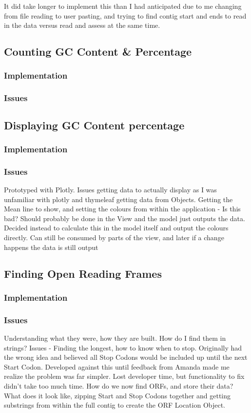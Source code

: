 It did take longer to implement this than I had anticipated due to me changing from file reading to user pasting, and trying to find contig start and ends to read in the data versus read and assess at the same time.

\subsection{Counting GC Content \& Percentage}
\subsubsection{Implementation}
\subsubsection{Issues}

\subsection{Displaying GC Content percentage}
\subsubsection{Implementation}
\subsubsection{Issues}
Prototyped with Plotly. Issues getting data to actually display as I was unfamiliar with plotly and thymeleaf getting data from Objects.
Getting the Mean line to show, and setting the colours from within the application - Is this bad? Should probably be done in the View and the model just outputs the data. Decided instead to calculate this in the model itself and output the colours directly. Can still be consumed by parts of the view, and later if a change happens the data is still output

\subsection{Finding Open Reading Frames}
\subsubsection{Implementation}
\subsubsection{Issues}
Understanding what they were, how they are built. How do I find them in strings? Issues - Finding the longest, how to know when to stop. Originally had the wrong idea and believed all Stop Codons would be included up until the next Start Codon. Developed against this until feedback from Amanda made me realize the problem was far simpler. Lost developer time, but functionality to fix didn't take too much time. How do we now find ORFs, and store their data? What does it look like, zipping Start and Stop Codons together and getting substrings from within the full contig to create the ORF Location Object.


